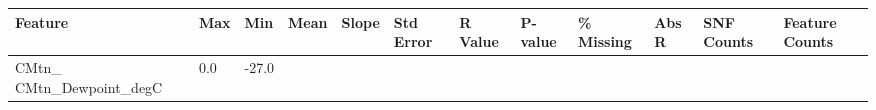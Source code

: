 \documentclass[11pt]{article}
\begin{document}
\begin{longtable}[]{@{}llllllllllll@{}}
\toprule
\begin{minipage}[b]{0.18\columnwidth}\raggedright\strut
Feature\strut
\end{minipage} & \begin{minipage}[b]{0.04\columnwidth}\raggedright\strut
Max\strut
\end{minipage} & \begin{minipage}[b]{0.04\columnwidth}\raggedright\strut
Min\strut
\end{minipage} & \begin{minipage}[b]{0.04\columnwidth}\raggedright\strut
Mean\strut
\end{minipage} & \begin{minipage}[b]{0.04\columnwidth}\raggedright\strut
Slope\strut
\end{minipage} & \begin{minipage}[b]{0.05\columnwidth}\raggedright\strut
Std Error\strut
\end{minipage} & \begin{minipage}[b]{0.04\columnwidth}\raggedright\strut
R Value\strut
\end{minipage} & \begin{minipage}[b]{0.04\columnwidth}\raggedright\strut
P-value\strut
\end{minipage} & \begin{minipage}[b]{0.05\columnwidth}\raggedright\strut
\% Missing\strut
\end{minipage} & \begin{minipage}[b]{0.05\columnwidth}\raggedright\strut
Abs R\strut
\end{minipage} & \begin{minipage}[b]{0.05\columnwidth}\raggedright\strut
SNF Counts\strut
\end{minipage} & \begin{minipage}[b]{0.07\columnwidth}\raggedright\strut
Feature Counts\strut
\end{minipage}\tabularnewline
\midrule
\endhead
\begin{minipage}[t]{0.18\columnwidth}\raggedright\strut
CMtn\_ CMtn\_Dewpoint\_degC\strut
\end{minipage} & \begin{minipage}[t]{0.04\columnwidth}\raggedright\strut
0.0\strut
\end{minipage} & \begin{minipage}[t]{0.04\columnwidth}\raggedright\strut
-27.0\strut
\end{minipage} & \begin{minipage}[t]{0.04\columnwidth}\raggedright\strut

\end{minipage}
\end{longtable}
\end{document}
